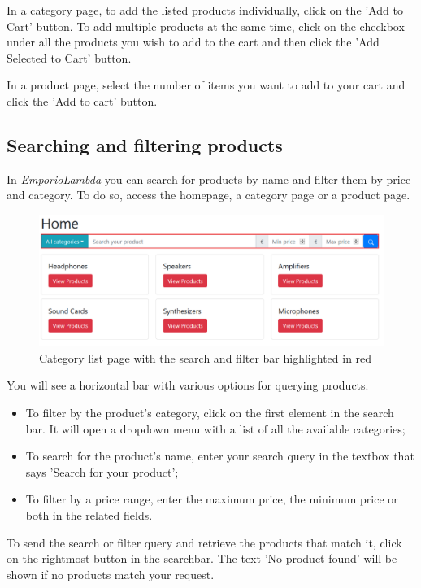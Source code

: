 In a category page, to add the listed products individually, click on the 'Add to Cart' button. To add multiple products at the same time, click on the checkbox under all the products you wish to add to the cart and then click the 'Add Selected to Cart' button.

In a product page, select the number of items you want to add to your cart and click the 'Add to cart' button.

\subsection{Searching and filtering products}
In \textit{EmporioLambda} you can search for products by name and filter them by price and category. To do so, access the homepage, a category page or a product page.

\begin{figure}[H]
\centering
\includegraphics[scale=0.6]{res/Immagini/SearchFilterBar}
\caption{Category list page with the search and filter bar highlighted in red}
\end{figure}

You will see a horizontal bar with various options for querying products.

\begin{itemize}
\item To filter by the product's category, click on the first element in the search bar. It will open a dropdown menu with a list of all the available categories;
\item To search for the product's name, enter your search query in the textbox that says 'Search for your product';
\item To filter by a price range, enter the maximum price, the minimum price or both in the related fields.
\end{itemize}

To send the search or filter query and retrieve the products that match it, click on the rightmost button in the searchbar. The text 'No product found' will be shown if no products match your request.

